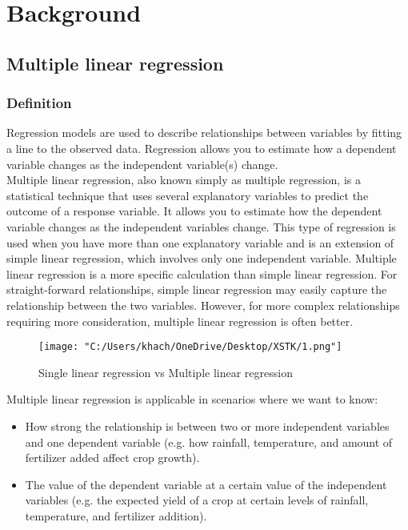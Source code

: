 \documentclass[a4paper]{article}
\begin{document}
	\section{Background }
	\subsection{Multiple linear regression}
	\subsubsection{Definition}
	Regression models are used to describe relationships between variables by fitting a line to the observed data. Regression allows you to estimate how a dependent variable changes as the independent variable(s) change.\\
	Multiple linear regression, also known simply as multiple regression, is a statistical technique that uses several explanatory variables to predict the outcome of a response variable. It allows you to estimate how the dependent variable changes as the independent variables change. This type of regression is used when you have more than one explanatory variable and is an extension of simple linear regression, which involves only one independent variable. Multiple linear regression is a more specific calculation than simple linear regression. For straight-forward relationships, simple linear regression may easily capture the relationship between the two variables. However, for more complex relationships requiring more consideration, multiple linear regression is often better.
	\begin{figure}[htbp]
		\centering
		\texttt{[image: "C:/Users/khach/OneDrive/Desktop/XSTK/1.png"]}
		\captionsetup{justification=centering}
		\vspace{0.5cm}
		\caption{Single linear regression vs Multiple linear regression}
		\label{fig:data_table}
	\end{figure}
	Multiple linear regression is applicable in scenarios where we want to know:
	\begin{itemize}
		\item How strong the relationship is between two or more independent variables and one dependent variable (e.g. how rainfall, temperature, and amount of fertilizer added affect crop growth).
		\item The value of the dependent variable at a certain value of the independent variables (e.g. the expected yield of a crop at certain levels of rainfall, temperature, and fertilizer addition).
	\end{itemize}
\end{document}
